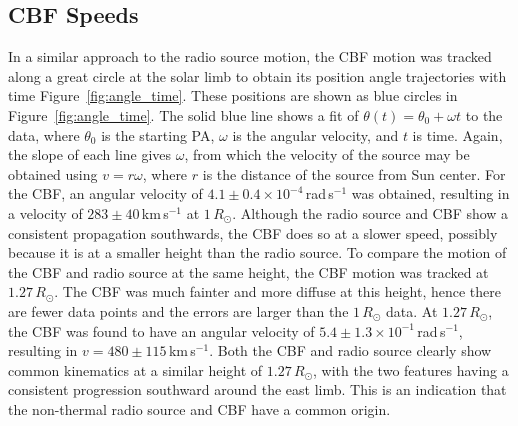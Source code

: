 \subsection{CBF Speeds}
In a similar approach to the radio source motion, the CBF motion was tracked along a great circle at the solar limb to obtain its position angle trajectories with time Figure~\ref{fig:angle_time}. These positions are shown as blue circles in Figure~\ref{fig:angle_time}. The solid blue line shows a fit of $\theta(t) = \theta_0 + \omega t$ to the data, where $\theta_0$ is the starting PA, $\omega$ is the angular velocity, and $t$ is time. Again, the slope of each line gives $\omega$, from which the velocity of the source may be obtained using $v=r\omega$, where $r$ is the distance of the source from Sun center. 
For the CBF, an angular velocity of $4.1\pm0.4\times10^{-4}$\,rad\,s$^{-1}$ was obtained, resulting in a velocity of $283\pm40$\,km\,s$^{-1}$ at $1\,R_{\odot}$. Although the radio source and CBF show a consistent propagation southwards, the CBF does so at a slower speed, possibly because it is at a smaller height than the radio source. To compare the motion of the CBF and radio source at the same height, the CBF motion was tracked at $1.27\,R_{\odot}$. The CBF was much fainter and more diffuse at this height, hence there are fewer data points and the errors are larger than the $1\,R_{\odot}$ data. At $1.27\,R_{\odot}$, the CBF was found to have an angular velocity of $5.4\pm1.3\times10^{-1}$\,rad\,s$^{-1}$, resulting in $v=480\pm115$\,km\,s$^{-1}$. Both the CBF and radio source clearly show common kinematics at a similar height of $1.27\,R_{\odot}$, with the two features having a consistent progression southward around the east limb. This is an indication that the non-thermal radio source and CBF have a common origin.

